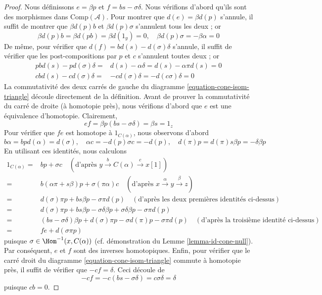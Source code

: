 \begin{proof}
\medskip\noindent
Nous définissons $e=\beta p$ et $f=bs-\sigma\delta$. Nous vérifions d'abord qu'ils
sont des morphismes dans $\text{Comp}(\mathcal{A})$. Pour montrer que $d(e)=\beta
d(p)$ s'annule, il suffit de montrer que $\beta d(p)b$ et $\beta d(p)\sigma$
s'annulent tous les deux ; or
$$
\beta d(p)b = \beta d(pb) = \beta d(1_y) = 0,\quad
\beta d(p)\sigma = -\beta\alpha = 0
$$
De même, pour vérifier que $d(f)=bd(s)-d(\sigma)\delta$ s'annule, il suffit de
vérifier que les post-compositions par $p$ et $c$ s'annulent toutes deux ;
or
\begin{align*}
pbd(s) - pd(\sigma)\delta
= &
d(s)-\alpha\delta = d(s)-\alpha\pi d(s) = 0 \\
cbd(s)-cd(\sigma)\delta
= &
-cd(\sigma)\delta = -d(c\sigma)\delta = 0
\end{align*}
La commutativité des deux carrés de gauche du diagramme
\ref{equation-cone-isom-triangle} découle directement de la définition. Avant de
prouver la commutativité du carré de droite (à homotopie près), nous vérifions
d'abord que $e$ est une équivalence d'homotopie. Clairement,
$$
ef=\beta p (bs-\sigma\delta)=\beta s=1_z
$$
Pour vérifier que $fe$ est homotope à $1_{C(\alpha)}$, nous observons d'abord
$$
b\alpha = bpd(\alpha) = d(\sigma),\quad
\alpha c = -d(p)\sigma c = -d(p),\quad
d(\pi)p = d(\pi)s\beta p = -\delta\beta p
$$
En utilisant ces identités, nous calculons
\begin{align*}
1_{C(\alpha)} = &
bp + \sigma c
\quad (\text{d'après }y \xrightarrow{b} C(\alpha) \xrightarrow{c} x[1]) \\
= &
b(\alpha\pi + s\beta)p + \sigma(\pi\alpha)c
\quad (\text{d'après }x \xrightarrow{\alpha} y \xrightarrow{\beta} z) \\
= &
d(\sigma)\pi p + bs\beta p - \sigma\pi d(p)
\quad (\text{d'après les deux premières identités ci-dessus}) \\
= &
d(\sigma)\pi p + bs\beta p - \sigma\delta\beta p
+ \sigma\delta\beta p - \sigma\pi d(p) \\
= &
(bs - \sigma\delta)\beta p + d(\sigma)\pi p
- \sigma d(\pi)p - \sigma\pi d(p)\quad
(\text{d'après la troisième identité ci-dessus}) \\
= &
fe + d(\sigma \pi p)
\end{align*}
puisque $\sigma \in \Hom^{-1}(x, C(\alpha))$ (cf. démonstration du Lemme
\ref{lemma-id-cone-null}). Par conséquent, $e$ et $f$ sont des inverses
homotopiques. Enfin, pour vérifier que le carré droit du diagramme
\ref{equation-cone-isom-triangle} commute à homotopie près, il suffit de vérifier
que $-cf=\delta$. Ceci découle de
$$
-cf = -c(bs-\sigma\delta) = c\sigma\delta = \delta
$$
puisque $cb=0$.


\end{proof}

